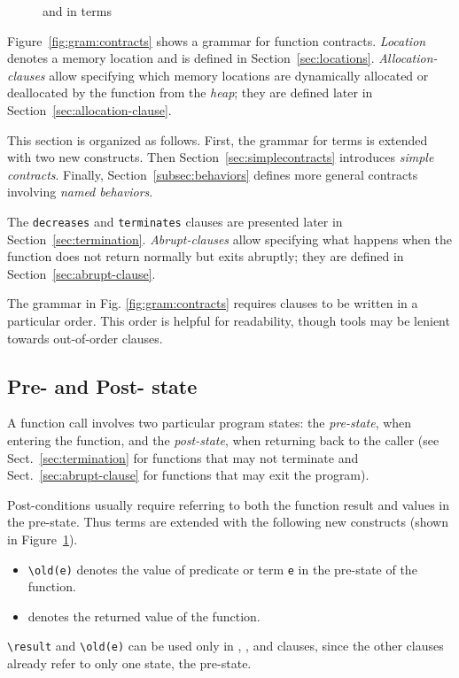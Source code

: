 \begin{figure}[htp]
  \begin{cadre}
      
    \end{cadre}
    \caption{\protect\old and \protect\result in terms}
  \label{fig:gram:oldandresult}
\end{figure}

Figure~\ref{fig:gram:contracts} shows a grammar for function
contracts. \textsl{Location} denotes a memory location and is defined
in Section~\ref{sec:locations}.
\textsl{Allocation-clauses} allow specifying which memory locations
are dynamically allocated or deallocated by the function from the \textsl{heap};
they are defined later in Section~\ref{sec:allocation-clause}.

This section is organized as follows. First, the grammar for terms is
extended with two new constructs.  Then
Section~\ref{sec:simplecontracts} introduces \emph{simple contracts}.
Finally, Section~\ref{subsec:behaviors} defines more general contracts
involving \emph{named behaviors}.

The \lstinline|decreases| and
\lstinline|terminates| clauses are presented later in
Section~\ref{sec:termination}.
\textsl{Abrupt-clauses}
allow specifying what happens when the function does not return
normally but exits abruptly; they are defined in
Section~\ref{sec:abrupt-clause}.

The grammar in Fig. \ref{fig:gram:contracts} requires clauses to be written
in a particular order. This order is helpful for readability, though tools may
be lenient towards out-of-order clauses.

\subsection{Pre- and Post- state}
\label{sec:pre-post-state}
A function call involves two particular program states: the
\emph{pre-state}, when entering the function, and the \emph{post-state},
when returning back to the caller (see Sect.~\ref{sec:termination}
for functions that may not terminate and Sect.~\ref{sec:abrupt-clause}
for functions that may exit the program).

Post-conditions usually require referring to both the function result and
values in the pre-state. Thus terms are extended with the following new
constructs (shown in Figure~\ref{fig:gram:oldandresult}).
\begin{itemize}
\item \lstinline|\old(e)| denotes the value of
  predicate or term \lstinline|e| in the pre-state of the function.
\item \result{} denotes the returned value of the function.
\end{itemize}
\lstinline|\result| and \lstinline|\old(e)| can be used only in \ensures{}, \assigns{},
\allocates{} and \frees{} clauses, since
the other clauses already refer to only one state, the pre-state.

